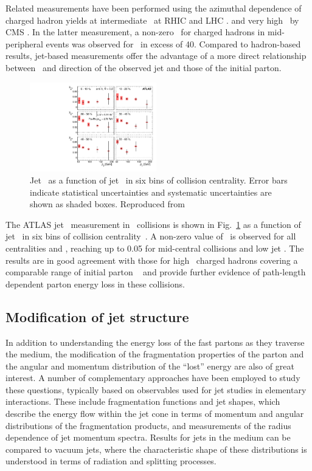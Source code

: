 Related measurements have been performed using the azimuthal dependence
of charged hadron yields at intermediate \pT\ at RHIC and LHC
\cite{Adams:2004wz,Adler:2006bw,Adare:2010sp, ATLAS:2011ah, Abelev:2012di}.
and very high \pT\ by CMS \cite{Chatrchyan:2012xq}. In the latter
measurement, a non-zero \vtwo\ for charged hadrons in mid-peripheral
events was observed for \pT\ in excess of 40\GeVc.
Compared to hadron-based results, jet-based measurements offer the advantage
of a more direct relationship between \pT\ and direction of the observed
jet and those of the initial parton.

\begin{figure}[!th]
\begin{center}
\includegraphics[width=0.49\textwidth]{jetfigures/ATLAS_jetv2.pdf}
\caption{Jet \vtwo\ as a function of jet \pT\ in six bins of
collision centrality.
Error bars indicate statistical uncertainties and
systematic uncertainties are shown as shaded boxes. Reproduced from~\cite{Aad:2013sla}}
\label{fig:GR:ATLAS_jet_v2}
\end{center}
\end{figure}

The ATLAS jet \vtwo\ measurement in \PbPb\ collisions
is shown in Fig.~\ref{fig:GR:ATLAS_jet_v2} as a function of jet \pT\
in six bins of collision centrality~\cite{Aad:2013sla}. A non-zero
value of \vtwo\ is observed for all centralities and \pT, reaching up to 0.05 for
mid-central collisions and low jet \pT. The results are in good agreement
with those for high \pT\ charged hadrons covering a comparable range
of initial parton \pT~\cite{Chatrchyan:2012xq} and provide further
evidence of path-length dependent parton energy loss in these collisions.

\subsection{Modification of jet structure}


In addition to understanding the energy loss of the fast partons as they traverse
the medium, the modification of the fragmentation properties of the parton and
the angular and momentum distribution of the ``lost'' energy are also of great interest.
A number of complementary approaches have been employed to study these questions,
typically based on observables used for jet studies in elementary interactions.
These include fragmentation functions and jet shapes, which describe the energy flow
within the jet cone in terms of momentum and angular distributions
of the fragmentation products, and measurements of the radius dependence
of jet momentum spectra.  Results for jets in the medium can
be compared to vacuum jets, where the characteristic shape of these
distributions is understood in terms of radiation and splitting
processes.

